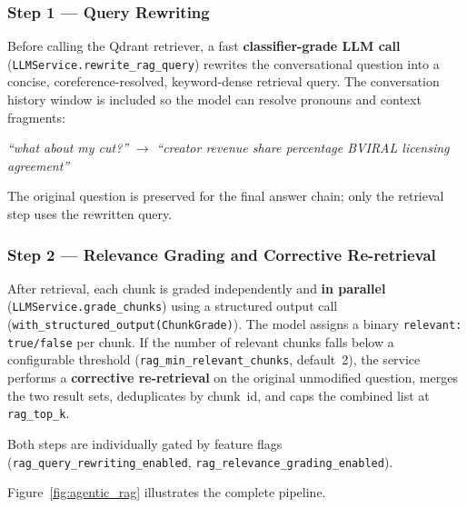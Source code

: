 \subsubsection{Step 1 — Query Rewriting}

Before calling the Qdrant retriever, a fast \textbf{classifier-grade LLM call}
(\texttt{LLMService.rewrite\_rag\_query}) rewrites the conversational question into a
concise, coreference-resolved, keyword-dense retrieval query. The conversation history window
is included so the model can resolve pronouns and context fragments:

\begin{center}
\textit{``what about my cut?''} \quad $\longrightarrow$ \quad
\textit{``creator revenue share percentage BVIRAL licensing agreement''}
\end{center}

The original question is preserved for the final answer chain; only the retrieval step uses the
rewritten query.

\subsubsection{Step 2 — Relevance Grading and Corrective Re-retrieval}

After retrieval, each chunk is graded independently and \textbf{in parallel}
(\texttt{LLMService.grade\_chunks}) using a structured output call
(\texttt{with\_structured\_output(ChunkGrade)}). The model assigns a binary
\texttt{relevant: true/false} per chunk. If the number of relevant chunks falls below a
configurable threshold (\texttt{rag\_min\_relevant\_chunks}, default~2), the service performs a
\textbf{corrective re-retrieval} on the original unmodified question, merges the two result
sets, deduplicates by chunk~id, and caps the combined list at \texttt{rag\_top\_k}.

Both steps are individually gated by feature flags
(\texttt{rag\_query\_rewriting\_enabled}, \texttt{rag\_relevance\_grading\_enabled}).

Figure~\ref{fig:agentic_rag} illustrates the complete pipeline.

